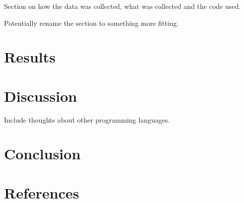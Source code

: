 \documentclass{article}
\begin{document}
Section on how the data was collected, what was collected and the code used. 

Potentially rename the section to something more fitting.

\section{Results}

\section{Discussion}

Include thoughts about other programming languages.

\section{Conclusion}
\newpage
\section{References}
\printbibliography
\end{document}
